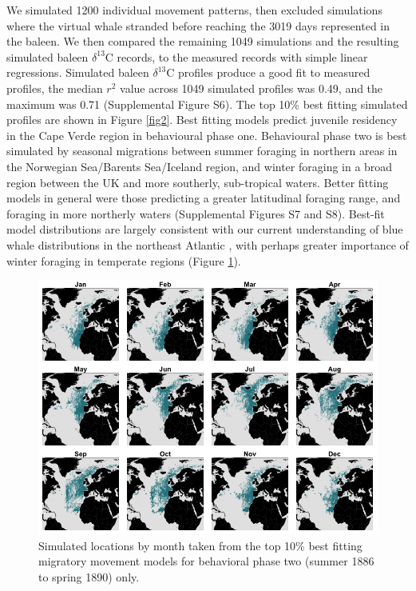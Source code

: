 \documentclass[9pt,twocolumn,twoside,lineno]{pnas-new}
\begin{document}
We simulated 1200 individual movement patterns, then excluded simulations where the virtual whale stranded before reaching the 3019 days represented in the baleen.
We then compared the remaining 1049 simulations and the resulting simulated baleen $\delta^{13}$C records, to the measured records with simple linear regressions. 
Simulated baleen $\delta^{13}$C profiles produce a good fit to measured profiles, the median $r^2$ value across 1049 simulated profiles was 0.49, and the maximum was 0.71 (Supplemental Figure S6).
The top 10\% best fitting simulated profiles are shown in Figure \ref{fig2}. 
Best fitting models predict juvenile residency in the Cape Verde region in behavioural phase one. 
Behavioural phase two is best simulated by seasonal migrations between summer foraging in northern areas in the Norwegian Sea/Barents Sea/Iceland region, and winter foraging in a broad region between the UK and more southerly, sub-tropical waters. 
Better fitting models in general were those predicting a greater latitudinal foraging range, and foraging in more northerly waters (Supplemental Figures S7 and S8).
Best-fit model distributions are largely consistent with our current understanding of blue whale distributions in the northeast Atlantic \cite{reeves2004historical,baines2014upwellings,baines2017autumn,reeves2004historical}, with perhaps greater importance of winter foraging in temperate regions (Figure \ref{fig4}).

\begin{figure}
 \centering
  \includegraphics[width = \linewidth]{figures/Figure-4-monthly.png}
  \caption{Simulated locations by month taken from the top 10\% best fitting migratory movement models for behavioral phase two (summer 1886 to spring 1890) only.}
  \label{fig4}
\end{figure}
\end{document}
